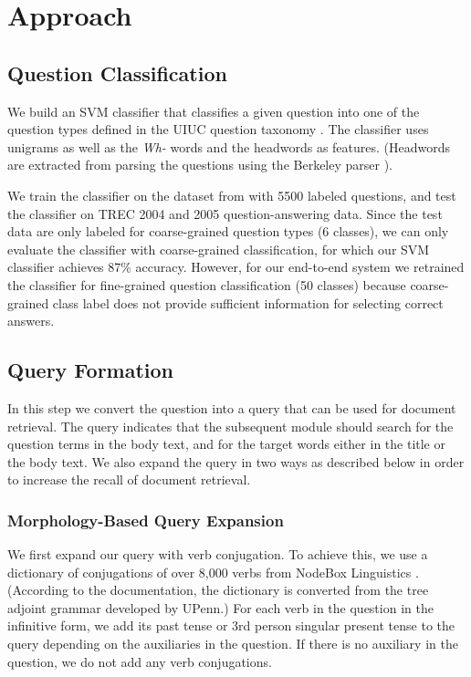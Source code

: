 \documentclass[11pt]{article}
\begin{document}
\section{Approach}
\subsection{Question Classification}
We build an SVM classifier that classifies a given question into one of the question types defined in the UIUC question taxonomy \cite{uiuc}. The classifier uses unigrams as well as the {\it Wh-} words and the headwords as features. (Headwords are extracted from parsing the questions using the Berkeley parser \cite{berkeleyparser}).

We train the classifier on the dataset from \cite{uiuc} with 5500 labeled questions, and test the classifier on TREC 2004 and 2005 question-answering data. Since the test data are only labeled for coarse-grained question types (6 classes), we can only evaluate the classifier with coarse-grained classification, for which our SVM classifier achieves 87\% accuracy. However, for our end-to-end system we retrained the classifier for fine-grained question classification (50 classes) because coarse-grained class label does not provide sufficient information for selecting correct answers.

\subsection{Query Formation}
In this step we convert the question into a query that can be used for document retrieval. The query indicates that the subsequent module should search for the question terms in the body text, and for the target words either in the title or the body text. We also expand the query in two ways as described below in order to increase the recall of document retrieval.

\subsubsection{Morphology-Based Query Expansion}
We first expand our query with verb conjugation. To achieve this, we use a dictionary of conjugations of over 8,000 verbs from NodeBox Linguistics \cite{nodebox}. (According to the documentation, the dictionary is converted from the tree adjoint grammar developed by UPenn.) For each verb in the question in the infinitive form, we add its past tense or 3rd person singular present tense to the query​ depending on the auxiliaries in the question. If there is no auxiliary in the question, we do not add any verb conjugations.
\end{document}
